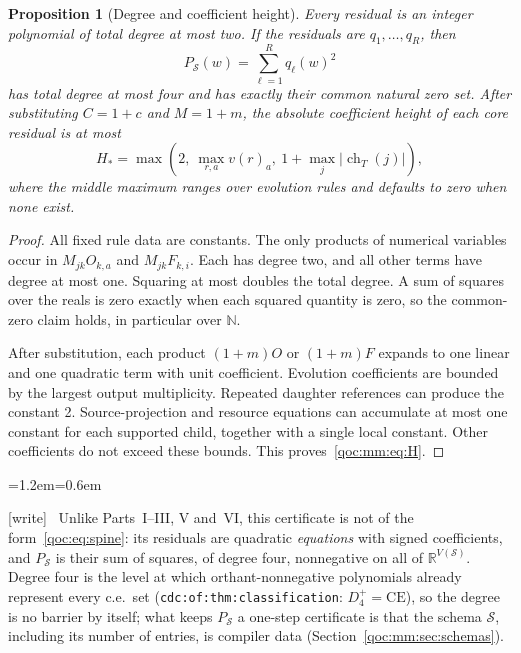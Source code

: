 \documentclass[11pt,letterpaper]{article}
\newtheorem{proposition}[theorem]{Proposition}
\theoremstyle{definition}
\theoremstyle{remark}
\newcommand{\N}{\mathbb N}
\newcommand{\R}{\mathbb R}
\newcommand{\ch}{\operatorname{ch}}
\newcommand{\abs}[1]{\left|#1\right|}
\newcommand{\wtag}{\textup{[write]}}
\newenvironment{writenote}{\par\smallskip\begin{list}{}{\leftmargin=1.2em\rightmargin=0.6em}\item[]\small\wtag\ }{\end{list}\smallskip}
\newcommand{\lab}[1]{\nolinkurl{#1}}
\newcommand{\Dplus}{D^{+}}
\begin{document}
\begin{proposition}[Degree and coefficient height]\label{qoc:mm:prop:degree}
Every residual is an integer polynomial of total degree at most two. If the residuals are $q_1,\ldots,q_R$, then
\begin{equation}\label{qoc:mm:eq:SOS}
 P_{\mathcal S}(w)=\sum_{\ell=1}^{R}q_\ell(w)^2
\end{equation}
has total degree at most four and has exactly their common natural zero set. After substituting $C=1+c$ and $M=1+m$, the absolute coefficient height of each core residual is at most
\begin{equation}\label{qoc:mm:eq:H}
 H_* = \max\left(2,\ \max_{r,a}v(r)_a,\ 1+\max_j\abs{\ch_T(j)}\right),
\end{equation}
where the middle maximum ranges over evolution rules and defaults to zero when none exist.
\end{proposition}
\begin{proof}
All fixed rule data are constants. The only products of numerical variables occur in $M_{jk}O_{k,a}$ and $M_{jk}F_{k,i}$. Each has degree two, and all other terms have degree at most one. Squaring at most doubles the total degree. A sum of squares over the reals is zero exactly when each squared quantity is zero, so the common-zero claim holds, in particular over $\N$.

After substitution, each product $(1+m)O$ or $(1+m)F$ expands to one linear and one quadratic term with unit coefficient. Evolution coefficients are bounded by the largest output multiplicity. Repeated daughter references can produce the constant 2. Source-projection and resource equations can accumulate at most one constant for each supported child, together with a single local constant. Other coefficients do not exceed these bounds. This proves~\eqref{qoc:mm:eq:H}.
\end{proof}

\begin{writenote}
Unlike Parts~I--III, V and~VI, this certificate is not of the form~\eqref{qoc:eq:spine}: its residuals are quadratic \emph{equations} with signed coefficients, and $P_{\mathcal S}$ is their sum of squares, of degree four, nonnegative on all of $\R^{V(\mathcal S)}$. Degree four is the level at which orthant-nonnegative polynomials already represent every c.e.\ set (\lab{cdc:of:thm:classification}: $\Dplus_4=\mathrm{CE}$), so the degree is no barrier by itself; what keeps $P_{\mathcal S}$ a one-step certificate is that the schema $\mathcal S$, including its number of entries, is compiler data (Section~\ref{qoc:mm:sec:schemas}).
\end{writenote}
\end{document}
